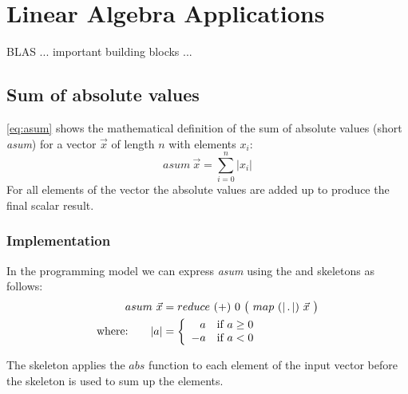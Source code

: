 \section{Linear Algebra Applications}
\label{section:skelcl:evaluation:linearAlgebra}

BLAS ... important building blocks ...

\subsection{Sum of absolute values}
\label{sec:asum}
\autoref{eq:asum} shows the mathematical definition of the sum of absolute values (short \emph{asum}) for a vector $\vec{x}$ of length $n$ with elements $x_i$:
\begin{equation}
  asum\ \vec{x} = \sum_{i=0}^{n} | x_i |
  \label{eq:asum}
\end{equation}
For all elements of the vector the absolute values are added up to produce the final scalar result.

\subsubsection*{\SkelCL Implementation}
In the \SkelCL programming model we can express \emph{asum} using the \map and \reduce skeletons as follows:
\begin{align}
  asum\ \vec{x} &= reduce\ (+)\ 0\ \big(\ map\ (|\, .\, |)\ \vec{x}\ \big)\label{eq:asum:skelcl}\\
  \text{where:} \qquad | a | &=
    \left\{
      \begin{array}{r l}
      a & \text{if } a \geq 0\\
      -a & \text{if } a < 0
      \end{array}
    \right.\nonumber
\end{align}

The \map skeleton applies the $abs$ function to each element of the input vector before the \reduce skeleton is used to sum up the elements.

